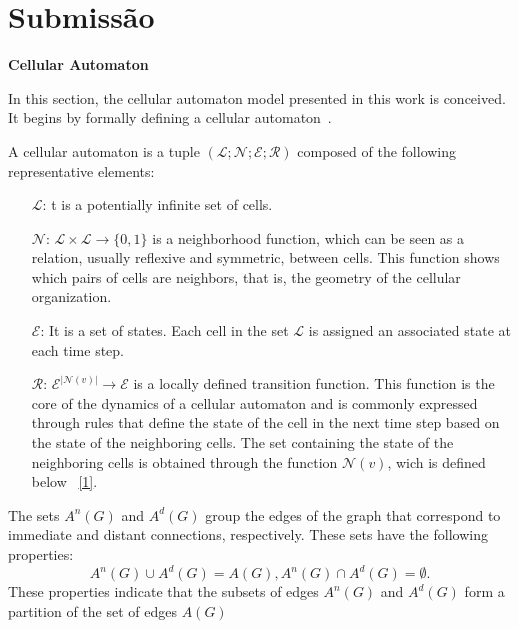 \documentclass[a4paper,11pt]{article}
\begin{document}
{\section*{Submissão}

\textbf{Cellular Automaton}

In this section, the cellular automaton model presented in this work is conceived. It begins by formally defining a cellular automaton~\cite{5}.

A cellular automaton is a tuple $(\mathcal{L}; \mathcal{N}; \mathcal{E}; \mathcal{R})$ composed of the following representative elements:
\begin{itemize}
\item [$\mathcal{L}$:] t is a potentially infinite set of cells.
\item [$\mathcal{N}$:] $\mathcal{L} \times \mathcal{L} \rightarrow \lbrace 0,1 \rbrace$ is a neighborhood function, which can be seen as a relation, usually reflexive and symmetric, between cells. This function shows which pairs of cells are neighbors, that is, the geometry of the cellular organization.
\item [$\mathcal{E}$:] It is a set of states. Each cell in the set $\mathcal{L}$ is assigned an associated state at each time step.
\item [$\mathcal{R}$:] $\mathcal{E}^{|\mathcal{N}(v)|} \rightarrow \mathcal{E}$ is a locally defined transition function. This function is the core of the dynamics of a cellular automaton and is commonly expressed through rules that define the state of the cell in the next time step based on the state of the neighboring cells. The set containing the state of the neighboring cells is obtained through the function $\mathcal{N}(v)$, wich is defined below ~\ref{1}.
\end{itemize}

The sets $A^n(G)$ and $A^d(G)$ group the edges of the graph that correspond to immediate and distant connections, respectively. These sets have the following properties:
\begin{subequations}
\begin{equation}
A^n(G) \cup A^d(G) = A(G),
\end{equation}
\begin{equation}
A^n(G) \cap A^d(G) = \emptyset.
\end{equation}
\end{subequations}
These properties indicate that the subsets of edges $A^n(G)$ and $A^d(G)$ form a partition of the set of edges $A(G)$

}
\end{document}
